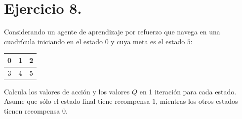 \documentclass[12pt,letterpaper]{article}
\begin{document}
\bigskip



\newpage

\section{Ejercicio 8.}
Considerando un agente de aprendizaje por refuerzo que navega en una cuadrícula iniciando en el estado $0$ y cuya meta es el estado $5$:
\begin{center}
  \begin{tabular}{|c|c|c|}
    \hline
    0 & 1 & 2 \\
    \hline
    3 & 4 & 5\\
    \hline 
  \end{tabular}
\end{center}
Calcula los valores de acción y los valores $Q$ en 1 iteración para cada estado. Asume que sólo el estado final tiene recompensa $1$, mientras los otros estados tienen recompensa $0$.

\bigskip


\end{document}
